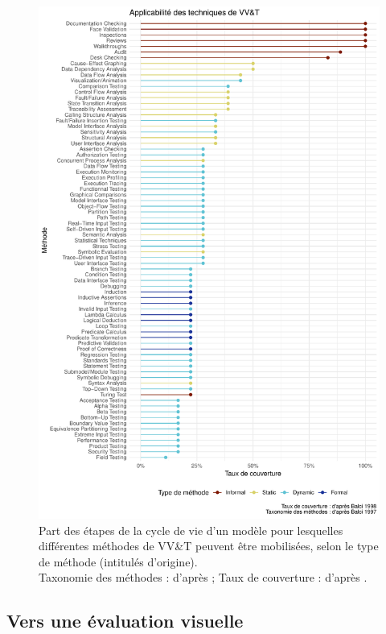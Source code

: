 \begin{figure}[H]
	\includegraphics[width=\linewidth]{img/VVetT_Balci.pdf}
	\caption[Part des étapes de la cycle de vie d'un modèle pour lesquelles différentes méthodes de \og VV\&T\fg{} peuvent être mobilisées.]{Part des étapes de la cycle de vie d'un modèle pour lesquelles différentes méthodes de \og VV\&T\fg{} peuvent être mobilisées, selon le type de méthode (intitulés d'origine).\\
	Taxonomie des méthodes : d'après \textcite[Figure 2, p. 139]{balci_verification_1997} ; 
	Taux de couverture : d'après \textcite[Table 3, pp. 45-47]{balci1998verification}.}
	\label{fig:taxonomy_balci}
\end{figure}


\subsection{Vers une évaluation visuelle}

